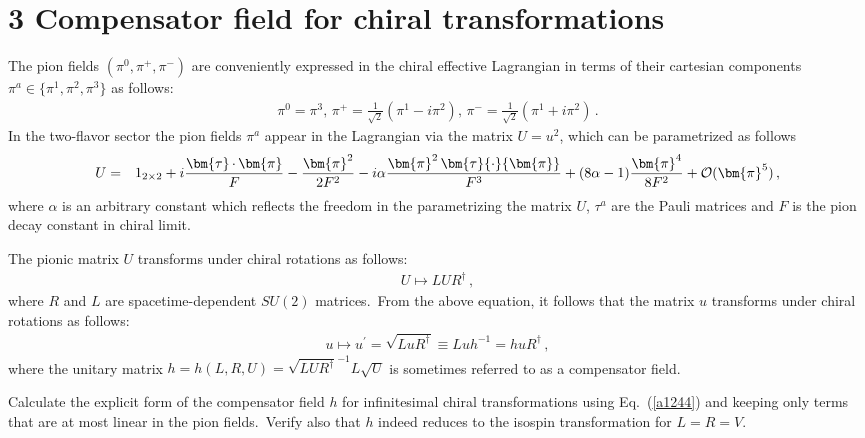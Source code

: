 \documentclass[prd,%
,superscriptaddress,%
nofootinbib,%
tightenlines ]{revtex4}
\begin{document}
\section*{3 Compensator field for chiral transformations}
\noindent
The pion fields $(\pi^0, \pi^+, \pi^-)$ are conveniently expressed in the chiral effective Lagrangian in terms of their cartesian components $\pi^a \in \{ \pi^1, \pi^2, \pi^3\}$ as follows:
\begin{eqnarray}
\pi^0
=
\pi^3
,\,
\pi^+
=
\frac{1}{\sqrt{2}} \left( \pi^1 - i  \pi^2 \right)
,\,
\pi^-
=
\frac{1}{\sqrt{2}} \left( \pi^1 + i  \pi^2 \right)
\,.
\label{PhyIso}
\end{eqnarray}
In the two-flavor sector the pion fields $\pi^a$ appear in the Lagrangian via the matrix $U = u^2$, which can be parametrized as follows
\begin{eqnarray}
U
&=&
\boldmath{1}_{2\times 2} + i \frac{\bm{\tau}\,{\cdot}\,\bm{\pi}}{F} - \frac{\bm{\pi}^2}{2 F^2} -  i \alpha \frac{\bm{\pi}^2 \, \bm{\tau}{\cdot}{\bm{\pi}}}{F^3} + (8 \alpha -1)\frac{\bm{\pi}^4}{8 F^2} + \mathcal{O}(\bm{\pi}^5)
 \label{a1244}
\,,
\end{eqnarray}
where $\alpha$ is an arbitrary constant which reflects the freedom in the parametrizing the matrix $U$, $\tau^a$ are the Pauli matrices and $F$ is the pion decay constant in chiral limit.~

   The pionic matrix $U$ transforms under  chiral rotations as follows:
\begin{eqnarray}
U
\mapsto  L U R^\dagger
\,,
\end{eqnarray}
where $R$ and $L$ are spacetime-dependent $SU(2)$ matrices.~From the above equation, it follows that the matrix $u$ transforms under chiral rotations as follows:
\begin{eqnarray}
u
\mapsto  u^\prime = \sqrt{L u R^\dagger} \equiv L u h^{-1} = h u R^\dagger
\,,
\end{eqnarray}
where the unitary matrix $h = h(L, R, U) = \sqrt{L U R^\dagger}^{-1} L \sqrt{U}$ is sometimes referred to as a compensator field.

   Calculate the explicit form of the compensator field $h$ for infinitesimal chiral transformations using Eq.~(\ref{a1244}) and keeping only terms that are at most linear in the pion fields.~Verify also that $h$ indeed reduces to the isospin transformation for $L = R = V$.
   
\end{document}
